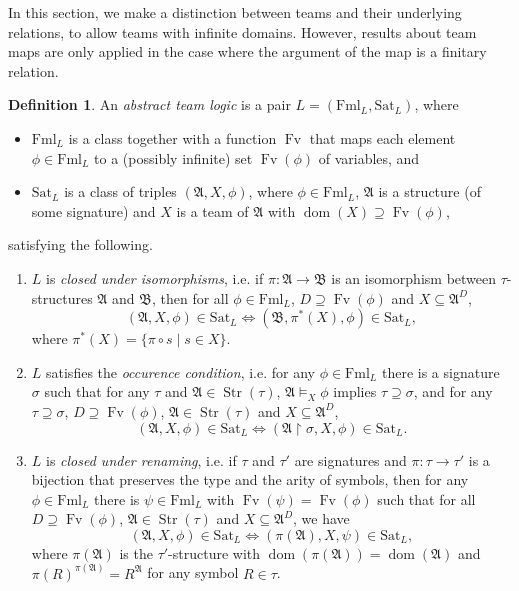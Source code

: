 \documentclass[a4paper]{amsart}
\theoremstyle{definition}
\newtheorem{definition}{Definition}[section]
\theoremstyle{remark}
\renewcommand{\restriction}{ {\upharpoonright} }
\newcommand{\A}{\mathcal{A}}
\newcommand{\B}{\mathcal{B}}
\DeclareMathOperator{\dom}{dom}
\DeclareMathOperator{\Fv}{Fv}
\theoremstyle{definition}
\renewcommand{\A}{\mathfrak{A}}
\renewcommand{\B}{\mathfrak{B}}
\DeclareMathOperator{\Str}{Str}
\newcommand{\Fml}{\mathrm{Fml}_L}
\newcommand{\Sat}{\mathrm{Sat}_L}
\begin{document}
In this section, we make a distinction between teams and their underlying relations, to allow teams with infinite domains. However, results about team maps are only applied in the case where the argument of the map is a finitary relation.


\begin{definition}
    An \emph{abstract team logic} is a pair $L=(\Fml,\Sat)$, where
    \begin{itemize}
        \item $\Fml$ is a class together with a function $\Fv$ that maps each element $\phi\in\Fml$ to a (possibly infinite) set $\Fv(\phi)$ of variables, and
        \item $\Sat$ is a class of triples $(\A,X,\phi)$, where $\phi\in\Fml$, $\A$ is a structure (of some signature) and $X$ is a team of $\A$ with $\dom(X)\supseteq\Fv(\phi)$,
    \end{itemize}
    satisfying the following.
    \begin{enumerate}
        \item $L$ is \emph{closed under isomorphisms}, i.e. if $\pi\colon\A\to\B$ is an isomorphism between $\tau$-structures $\A$ and $\B$, then for all $\phi\in\Fml$, $D\supseteq\Fv(\phi)$ and $X\subseteq\A^D$,
        \[
            (\A,X,\phi)\in\Sat \iff (\B,\pi^*(X),\phi)\in\Sat,
        \]
        where $\pi^*(X)=\{ \pi\circ s \mid s\in X \}$.

        \item $L$ satisfies the \emph{occurence condition}, i.e. for any $\phi\in\Fml$ there is a signature $\sigma$ such that for any $\tau$ and $\A\in\Str(\tau)$, $\A\models_X\phi$ implies $\tau\supseteq\sigma$, and for any $\tau\supseteq\sigma$, $D\supseteq\Fv(\phi)$, $\A\in\Str(\tau)$ and $X\subseteq\A^D$,
        \[
            (\A,X,\phi)\in\Sat \iff (\A\restriction\sigma,X,\phi)\in\Sat.
        \]

        \item $L$ is \emph{closed under renaming}, i.e. if $\tau$ and $\tau'$ are signatures and $\pi\colon\tau\to\tau'$ is a bijection that preserves the type and the arity of symbols, then for any $\phi\in\Fml$ there is $\psi\in\Fml$ with $\Fv(\psi)=\Fv(\phi)$ such that for all $D\supseteq\Fv(\phi)$, $\A\in\Str(\tau)$ and $X\subseteq\A^D$, we have
        \[
            (\A,X,\phi)\in\Sat \iff (\pi(\A),X,\psi)\in\Sat,
        \]
        where $\pi(\A)$ is the $\tau'$-structure with $\dom(\pi(\A)) = \dom(\A)$ and $\pi(R)^{\pi(\A)} = R^\A$ for any symbol $R\in\tau$.
    \end{enumerate}
\end{definition}
\end{document}
